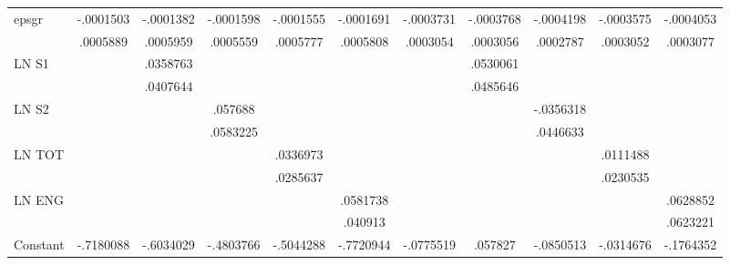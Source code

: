 \begin{table}[htbp]
\begin{tabular}{l*{10}{c}}
epsgr           &-.0001503         &-.0001382         &-.0001598         &-.0001555         &-.0001691         &-.0003731         &-.0003768         &-.0004198         &-.0003575         &-.0004053         \\
                & .0005889         & .0005959         & .0005559         & .0005777         & .0005808         & .0003054         & .0003056         & .0002787         & .0003052         & .0003077         \\
LN S1           &                  & .0358763         &                  &                  &                  &                  & .0530061         &                  &                  &                  \\
                &                  & .0407644         &                  &                  &                  &                  & .0485646         &                  &                  &                  \\
LN S2           &                  &                  &  .057688         &                  &                  &                  &                  &-.0356318         &                  &                  \\
                &                  &                  & .0583225         &                  &                  &                  &                  & .0446633         &                  &                  \\
LN TOT          &                  &                  &                  & .0336973         &                  &                  &                  &                  & .0111488         &                  \\
                &                  &                  &                  & .0285637         &                  &                  &                  &                  & .0230535         &                  \\
LN ENG          &                  &                  &                  &                  & .0581738         &                  &                  &                  &                  & .0628852         \\
                &                  &                  &                  &                  &  .040913         &                  &                  &                  &                  & .0623221         \\
Constant        &-.7180088         &-.6034029         &-.4803766         &-.5044288         &-.7720944         &-.0775519         &  .057827         &-.0850513         &-.0314676         &-.1764352         \\

\end{tabular}
\end{table}
